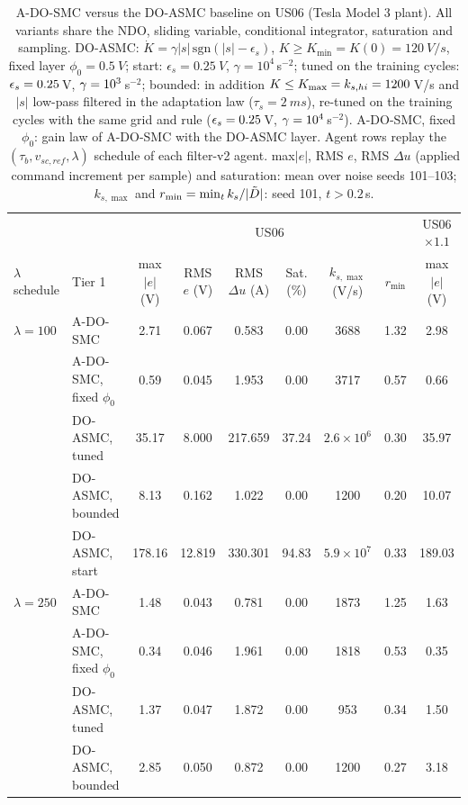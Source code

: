 \begin{table}[t]
\centering\footnotesize\setlength{\tabcolsep}{4pt}
\caption{A-DO-SMC versus the DO-ASMC baseline on US06 (Tesla Model 3 plant). All variants share the NDO, sliding variable, conditional integrator, saturation and sampling. DO-ASMC: $\dot K=\gamma|s|\,\mathrm{sgn}(|s|-\epsilon_s)$, $K\ge K_{\min}=K(0)=\SI{120}{V/s}$, fixed layer $\phi_0=\SI{0.5}{V}$; start: $\epsilon_s=\SI{0.25}{V}$, $\gamma=10^4$\,s$^{-2}$; tuned on the training cycles: $\epsilon_s=0.25$\,V, $\gamma=10^{3}$\,s$^{-2}$; bounded: in addition $K\le K_{\max}=k_{s,hi}=1200$\,V/s and $|s|$ low-pass filtered in the adaptation law ($\tau_s=\SI{2}{ms}$), re-tuned on the training cycles with the same grid and rule ($\epsilon_s=0.25$\,V, $\gamma=10^{4}$\,s$^{-2}$). A-DO-SMC, fixed $\phi_0$: gain law of A-DO-SMC with the DO-ASMC layer. Agent rows replay the $(\tau_b,v_{sc,ref},\lambda)$ schedule of each filter-v2 agent. max$|e|$, RMS $e$, RMS $\Delta u$ (applied command increment per sample) and saturation: mean over noise seeds 101--103; $k_{s,\max}$ and $r_{\min}=\min_t k_s/|\tilde{D}|$: seed 101, $t>0.2$\,s.}
\label{tab:asmc}
\begin{tabular}{@{}llccccccc@{}}
\toprule
 & & \multicolumn{6}{c}{US06} & US06$\times1.1$\\
$\lambda$ schedule & Tier 1 & max$|e|$ (V) & RMS $e$ (V) & RMS $\Delta u$ (A) & Sat. (\%) & $k_{s,\max}$ (V/s) & $r_{\min}$ & max$|e|$ (V)\\
\midrule
$\lambda=100$ & A-DO-SMC & 2.71 & 0.067 & 0.583 & 0.00 & 3688 & 1.32 & 2.98\\
 & A-DO-SMC, fixed $\phi_0$ & 0.59 & 0.045 & 1.953 & 0.00 & 3717 & 0.57 & 0.66\\
 & DO-ASMC, tuned & 35.17 & 8.000 & 217.659 & 37.24 & $2.6{\times}10^{6}$ & 0.30 & 35.97\\
 & DO-ASMC, bounded & 8.13 & 0.162 & 1.022 & 0.00 & 1200 & 0.20 & 10.07\\
 & DO-ASMC, start & 178.16 & 12.819 & 330.301 & 94.83 & $5.9{\times}10^{7}$ & 0.33 & 189.03\\
\midrule
$\lambda=250$ & A-DO-SMC & 1.48 & 0.043 & 0.781 & 0.00 & 1873 & 1.25 & 1.63\\
 & A-DO-SMC, fixed $\phi_0$ & 0.34 & 0.046 & 1.961 & 0.00 & 1818 & 0.53 & 0.35\\
 & DO-ASMC, tuned & 1.37 & 0.047 & 1.872 & 0.00 & 953 & 0.34 & 1.50\\
 & DO-ASMC, bounded & 2.85 & 0.050 & 0.872 & 0.00 & 1200 & 0.27 & 3.18\\

\end{tabular}
\end{table}
